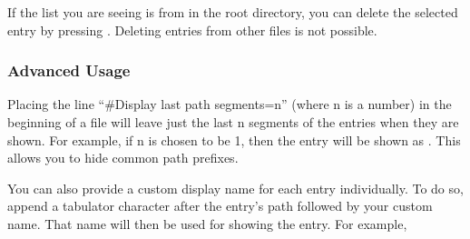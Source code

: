 If the list you are seeing is from  in the root
directory, you can delete the selected entry by pressing \ActionStdMenu.
Deleting entries from other  files is not possible.


\subsubsection{Advanced Usage}

Placing the line ``\#Display last path segments=n'' (where n is a number) in
the beginning of a  file will leave just the last n segments of
the entries when they are shown. For example, if n is chosen to be 1, then
the entry  will be shown as
. This allows you to hide common path prefixes.

You can also provide a custom display name for each entry individually. To
do so, append a tabulator character after the entry's path followed by your
custom name. That name will then be used for showing the entry. For example,
